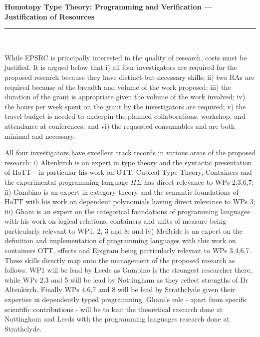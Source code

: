 \documentclass[a4paper,11pt]{article}
\begin{document}
\thispagestyle{plain}
\begin{center}
  {\Large \bf Homotopy Type Theory: Programming and Verification ---
  Justification of Resources}\\[1ex]

\vspace*{-0.1in}

\rule{160mm}{.5mm}\\[2ex]
\end{center}

While EPSRC is principally interested in the quality of research,
costs must be justified. It is argued below that i) all four investigators
are required for the proposed research because they have
distinct-but-necessary skills; ii) two RAs are required because of the
breadth and volume of the work proposed; iii) the duration of the
grant is appropriate given the volume of the work involved; iv) the
hours per week spent on the grant by the investigators are required;
v) the travel budget is needed to underpin the planned collaborations,
workshop, and attendance at conferences; and vi) the requested
consumables and are both minimal and necessary.

\vspace{0.02in}

 All four investigators have
excellent track records in various areas of the proposed research: i)
Altenkirch is an expert in type theory and the syntactic presentation
of HoTT - in particular his work on OTT, Cubical Type Theory,
Containers and the experimental programming language $\Pi\Sigma$ has
direct relevance to WPs 2,3,6,7; ii) Gambino is an expert in category
theory and the semantic foundations of HoTT with his work on dependent
polynomials having direct relevance to WPs 3; iii) Ghani
is an expert on the categorical foundations of programming languages
with his work on logical relations, containers and units of measure
being particularly relevant to WP1, 2, 3 and 8; and iv) McBride is an
expert on the definition and implementation of programming languages
with this work on containers OTT, effects and Epigram being
particularly relevant to WPs 3,4,6,7. These skills directly
map onto the management of the proposed research as follows. WP1 will
be lead by Leeds as Gambino is the strongest researcher there, while
WPs 2,3 and 5 will be lead by Nottingham as they reflect strengths of
Dr Altenkirch. Finally WPs 4,6,7 and 8 will be lead by Strathclyde
given their expertise in dependently typed programming. Ghani's role -
apart from specific scientific contributions - will be to knit the
theoretical research done at Nottingham and Leeds with the programming
languages research done at Strathclyde. 
\end{document}
